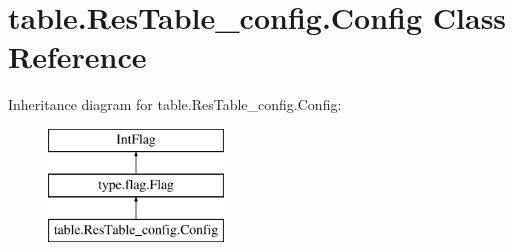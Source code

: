 \hypertarget{classtable_1_1ResTable__config_1_1Config}{}\section{table.\+Res\+Table\+\_\+config.\+Config Class Reference}
\label{classtable_1_1ResTable__config_1_1Config}
Inheritance diagram for table.\+Res\+Table\+\_\+config.\+Config\+:\begin{figure}[H]
\begin{center}
\leavevmode
\includegraphics[height=3.000000cm]{classtable_1_1ResTable__config_1_1Config}
\end{center}
\end{figure}
